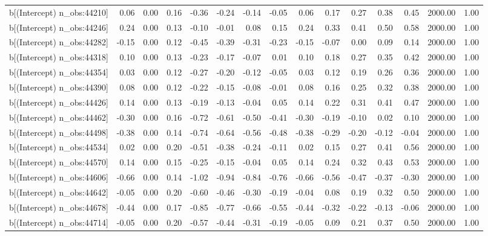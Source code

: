 \begin{table}[ht]
\begin{tabular}{rrrrrrrrrrrrrrr}
  b[(Intercept) n\_obs:44210] & 0.06 & 0.00 & 0.16 & -0.36 & -0.24 & -0.14 & -0.05 & 0.06 & 0.17 & 0.27 & 0.38 & 0.45 & 2000.00 & 1.00 \\ 
  b[(Intercept) n\_obs:44246] & 0.24 & 0.00 & 0.13 & -0.10 & -0.01 & 0.08 & 0.15 & 0.24 & 0.33 & 0.41 & 0.50 & 0.58 & 2000.00 & 1.00 \\ 
  b[(Intercept) n\_obs:44282] & -0.15 & 0.00 & 0.12 & -0.45 & -0.39 & -0.31 & -0.23 & -0.15 & -0.07 & 0.00 & 0.09 & 0.14 & 2000.00 & 1.00 \\ 
  b[(Intercept) n\_obs:44318] & 0.10 & 0.00 & 0.13 & -0.23 & -0.17 & -0.07 & 0.01 & 0.10 & 0.18 & 0.27 & 0.35 & 0.42 & 2000.00 & 1.00 \\ 
  b[(Intercept) n\_obs:44354] & 0.03 & 0.00 & 0.12 & -0.27 & -0.20 & -0.12 & -0.05 & 0.03 & 0.12 & 0.19 & 0.26 & 0.36 & 2000.00 & 1.00 \\ 
  b[(Intercept) n\_obs:44390] & 0.08 & 0.00 & 0.12 & -0.22 & -0.15 & -0.08 & -0.01 & 0.08 & 0.16 & 0.25 & 0.32 & 0.38 & 2000.00 & 1.00 \\ 
  b[(Intercept) n\_obs:44426] & 0.14 & 0.00 & 0.13 & -0.19 & -0.13 & -0.04 & 0.05 & 0.14 & 0.22 & 0.31 & 0.41 & 0.47 & 2000.00 & 1.00 \\ 
  b[(Intercept) n\_obs:44462] & -0.30 & 0.00 & 0.16 & -0.72 & -0.61 & -0.50 & -0.41 & -0.30 & -0.19 & -0.10 & 0.02 & 0.10 & 2000.00 & 1.00 \\ 
  b[(Intercept) n\_obs:44498] & -0.38 & 0.00 & 0.14 & -0.74 & -0.64 & -0.56 & -0.48 & -0.38 & -0.29 & -0.20 & -0.12 & -0.04 & 2000.00 & 1.00 \\ 
  b[(Intercept) n\_obs:44534] & 0.02 & 0.00 & 0.20 & -0.51 & -0.38 & -0.24 & -0.11 & 0.02 & 0.15 & 0.27 & 0.41 & 0.56 & 2000.00 & 1.00 \\ 
  b[(Intercept) n\_obs:44570] & 0.14 & 0.00 & 0.15 & -0.25 & -0.15 & -0.04 & 0.05 & 0.14 & 0.24 & 0.32 & 0.43 & 0.53 & 2000.00 & 1.00 \\ 
  b[(Intercept) n\_obs:44606] & -0.66 & 0.00 & 0.14 & -1.02 & -0.94 & -0.84 & -0.76 & -0.66 & -0.56 & -0.47 & -0.37 & -0.30 & 2000.00 & 1.00 \\ 
  b[(Intercept) n\_obs:44642] & -0.05 & 0.00 & 0.20 & -0.60 & -0.46 & -0.30 & -0.19 & -0.04 & 0.08 & 0.19 & 0.32 & 0.50 & 2000.00 & 1.00 \\ 
  b[(Intercept) n\_obs:44678] & -0.44 & 0.00 & 0.17 & -0.85 & -0.77 & -0.66 & -0.55 & -0.44 & -0.32 & -0.22 & -0.13 & -0.06 & 2000.00 & 1.00 \\ 
  b[(Intercept) n\_obs:44714] & -0.05 & 0.00 & 0.20 & -0.57 & -0.44 & -0.31 & -0.19 & -0.05 & 0.09 & 0.21 & 0.37 & 0.50 & 2000.00 & 1.00 \\ 

\end{tabular}
\end{table}
